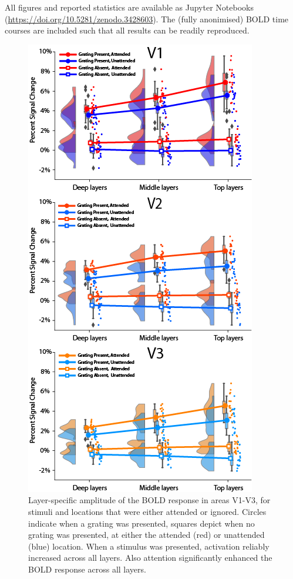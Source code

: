 \documentclass[9pt,lineno]{aperture}
\begin{document}
All figures and reported statistics are available as Jupyter Notebooks (\url{https://doi.org/10.5281/zenodo.3428603}). The (fully anonimised) BOLD time courses are included such that all results can be readily reproduced. 

\begin{figure}
\includegraphics[width=0.6\linewidth]{img/layer_region_stats_600.png}
\caption{Layer-specific amplitude of the BOLD response in areas V1-V3, for stimuli and locations that were either attended or ignored. Circles indicate when a grating was presented, squares depict when no grating was presented, at either the attended (red) or unattended (blue) location. When a stimulus was presented, activation reliably increased across all layers. Also attention significantly enhanced the BOLD response across all layers.}
\label{fig:layer_region_stats_600}


\end{figure}
\end{document}
